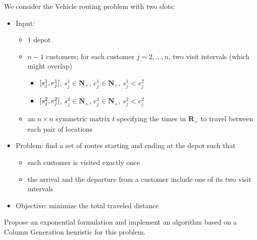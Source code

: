 \documentclass[a4paper]{article}
\newcommand{\N}{\mathbf{N}}
\newcommand{\R}{\mathbf{R}}
\begin{document}
We consider the Vehicle routing problem with two slots:
\begin{itemize}
  \item Input:
    \begin{itemize}
      \item $1$ depot
      \item $n - 1$ customers; for each customer $j = 2, \dots, n$, two visit intervals (which might overlap)
        \begin{itemize}
          \item $\interval[open right]{s_j^1}{e_j^1}$, $s_j^1 \in \N_+$, $e_j^1 \in \N_+$, $s_j^1 < e_j^2$
          \item $\interval[open right]{s_j^2}{e_j^2}$, $s_j^2 \in \N_+$, $e_j^2 \in \N_+$, $s_j^2 < e_j^2$
        \end{itemize}
      \item an $n \times n$ symmetric matrix $t$ specifying the times in $\R_+$ to travel between each pair of locations
    \end{itemize}
  \item Problem: find a set of routes starting and ending at the depot such that
    \begin{itemize}
      \item each customer is visited exactly once
      \item the arrival and the departure from a customer include one of its two visit intervals
    \end{itemize}
  \item Objective: minimize the total traveled distance
\end{itemize}

Propose an exponential formulation and implement an algorithm based on a Column Generation heuristic for this problem.
\end{document}

